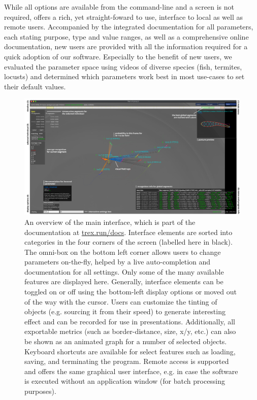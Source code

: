 \documentclass[9pt,lineno]{elife}
\newcommand{\TRex}{\protect\path{TRex}}
\begin{document}
While all options are available from the command-line and a screen is not required, \TRex{} offers a rich, yet straight-foward to use, interface to local as well as remote users. Accompanied by the integrated documentation for all parameters, each stating purpose, type and value ranges, as well as a comprehensive online documentation, {\color{blue}new users are provided with all the information required for a quick adoption of our software.} Especially to the benefit of new users, we evaluated the parameter space {\color{blue}using videos of diverse species} (fish, termites, locusts) and determined which parameters work best in most use-cases to set their default values.

\begin{figure}[h]
\includegraphics[width=1.0\linewidth]{figures/trex_screenshot.pdf}
\caption{An overview of \TRex{'} the main interface, which is part of the documentation at \href{https://trex.run/docs}{trex.run/docs}. Interface elements are sorted into categories in the four corners of the screen (labelled here in black). The omni-box on the bottom left corner allows users to change parameters on-the-fly, helped by a live auto-completion and documentation for all settings. Only some of the many available features are displayed here. Generally, interface elements can be toggled on or off using the bottom-left display options or moved out of the way with the cursor. Users can customize the tinting of objects (e.g. sourcing it from their speed) to generate interesting effect and can be recorded for use in presentations. Additionally, all exportable metrics (such as border-distance, size, x/y, etc.) can also be shown as an animated graph for a number of selected objects. Keyboard shortcuts are available for select features such as loading, saving, and terminating the program. Remote access is supported and offers the same graphical user interface, e.g. in case the software is executed without an application window (for batch processing purposes).}
\label{fig:trex_screenshot}
\end{figure}
\end{document}
